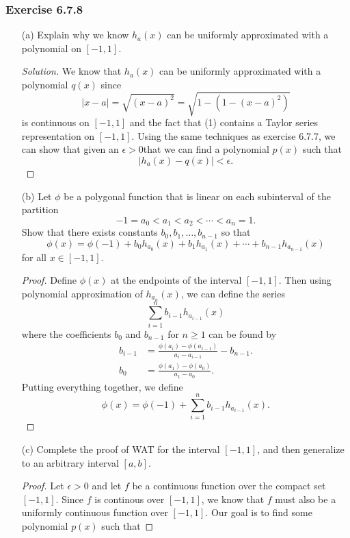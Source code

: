\subsubsection{Exercise 6.7.8} 
\begin{enumerate}
    \item[(a)] Explain why we know \( h_{a}(x)  \) can be uniformly approximated with a polynomial on \( [-1,1] \).
        \begin{proof}[Solution]
        We know that \( h_{a}(x)  \) can be uniformly approximated with a polynomial \( q(x)  \) since 
		\[  | x - a  | = \sqrt{ (x-a)^2  } = \sqrt{ 1 - (1 - (x-a)^2) } \tag{1}\]
		is continuous on \( [-1,1] \) and the fact that (1) contains a Taylor series representation on \( [-1,1] \).
		Using the same techniques as exercise 6.7.7, we can show that given an \( \epsilon > 0  \)that we can find a polynomial \( p(x)  \) such that 
		\[  | h_a(x) - q(x)   | < \epsilon. \]
        \end{proof}
	\item[(b)] Let \( \phi  \) be a polygonal function that is linear on each subinterval of the partition 
		\[  -1 = a_{0} < a_{1} < a_{2} < \dotsb < a_{n} = 1. \]
		Show that there exists constants \( b_{0}, b_{1}, \dots, b_{n-1} \) so that 
		\[  \phi(x) = \phi(-1) + b_{0} h_{a_0 }(x) + b_{1} h_{a_{1}}(x) + \dotsb + b_{n-1}h_{a_{n-1}}(x) \]
		for all \( x \in [-1,1] \).
		\begin{proof}
			Define \( \phi(x)  \) at the endpoints of the interval \( [-1,1] \). Then using polynomial approximation of \( h_{a_n}(x)  \), we can define the series
			\[  \sum_{ i=1 }^{ n  } b_{i-1} h_{a_{i-1}}(x) \]
			where the coefficients \( b_{0}  \) and \( b_{n-1}  \) for \( n \geq 1  \) can be found by 
			\begin{align*}
				b_{i-1} &= \frac{ \phi(a_i) - \phi(a_{i-1}) }{ a_i - a_{i-1}  }  - b_{n-1}.\\
				b_{0} &= \frac{ \phi(a_{1}) - \phi(a_{0})  }{ a_{1} - a_{0} }.
			\end{align*}
			Putting everything together, we define 
			\[  \phi(x) = \phi(-1) +  \sum_{ i=1 }^{ n  } b_{i-1} h_{a_{i-1}}(x). \]
		\end{proof}
	\item[(c)] Complete the proof of WAT for the interval \( [-1,1]  \), and then generalize to an arbitrary interval \( [a,b]  \).
		\begin{proof}
			Let \( \epsilon > 0\) and let \( f \) be a continuous function over the compact set \( [-1,1] \). Since \( f  \) is continous over \( [-1,1]  \), we know that \( f  \) must also be a uniformly continuous function over \( [-1,1] \). Our goal is to find some polynomial \( p(x)  \) such that 

\end{proof}
\end{enumerate}

